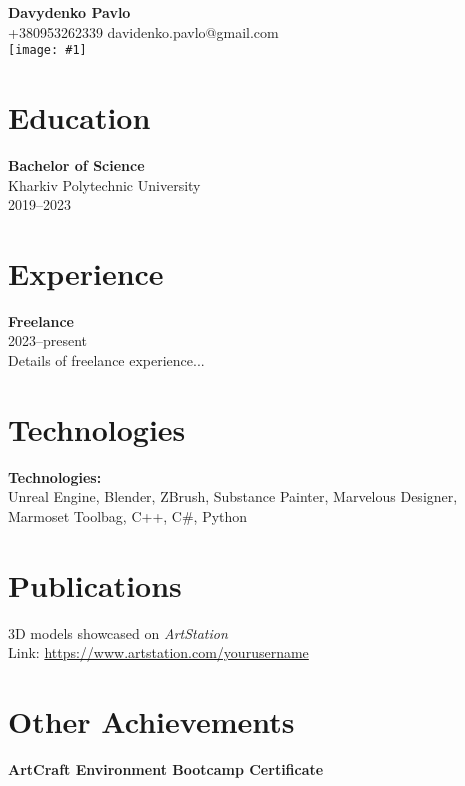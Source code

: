 \documentclass[a4paper,10pt]{article}
\newcommand{\photo}[1]{\texttt{[image: \#1]}}
\begin{document}
\begin{center}
    {\Huge \textbf{Davydenko Pavlo}} \\
    \vspace{0.2cm}
    +380953262339 \quad davidenko.pavlo@gmail.com \\
    \vspace{0.2cm}
    \photo{image.png} %
\end{center}

\section*{Education}
\textbf{Bachelor of Science} \\
Kharkiv Polytechnic University \\
2019--2023

\section*{Experience}
\textbf{Freelance} \\
2023--present \\
Details of freelance experience...

\section*{Technologies}
\textbf{Technologies:} \\
Unreal Engine, Blender, ZBrush, Substance Painter, Marvelous Designer, Marmoset Toolbag, C++, C\#, Python

\section*{Publications}
3D models showcased on \textit{ArtStation} \\
Link: \url{https://www.artstation.com/yourusername}

\section*{Other Achievements}
\textbf{ArtCraft Environment Bootcamp Certificate}
\end{document}
